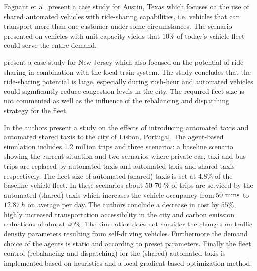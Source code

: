 Fagnant et al. \cite{fagnant2015dynamic} present a case study for Austin, Texas
which focuses on the use of shared automated vehicles with ride-sharing capabilities,
i.e. vehicles that can transport more than one customer under some circumstances.
The scenario presented on vehicles with unit capacity yields that 10\% of today's
vehicle fleet could serve the entire demand. %

\cite{zachariah2014uncongested} present a case study for New Jersey which also focused
on the potential of ride-sharing in combination with the local train system.
The study concludes that the ride-sharing potential
is large, especially during rush-hour and automated vehicles could significantly
reduce congestion levels in the city. The required fleet size is not commented
as well as the influence of the rebalancing and dispatching strategy for the fleet.

In \cite{martinez2017assessing} the authors present a study on the effects of
introducing automated taxis and automated shared taxis to the city of Lisbon,
Portugal. The agent-based simulation includes 1.2 million trips and three scenarios:
a baseline scenario showing the current situation and two scenarios where private car,
taxi and bus trips are replaced by automated taxis and automated taxis and shared
taxis respectively. The fleet size of automated (shared) taxis is set at $4.8\%$ of
the baseline vehicle fleet. In these scenarios about 50-70 \% of trips are serviced
by the automated (shared) taxis which increases the vehicle occupancy
from $50 ~ \textnormal{mins}$ to $12.87 ~ h$ on average per day. The authors conclude
a decrease in cost by $55 \%$, highly increased transportation
accessibility in the city and carbon emission reductions of almost $40\%$. The
simulation does not consider the changes on traffic density parameters resulting
from self-driving vehicles. Furthermore the demand choice of the agents is static
and according to preset parameters. Finally the fleet control (rebalancing and dispatching)
for the (shared) automated taxis is implemented based on heuristics and a local
gradient based optimization method.

